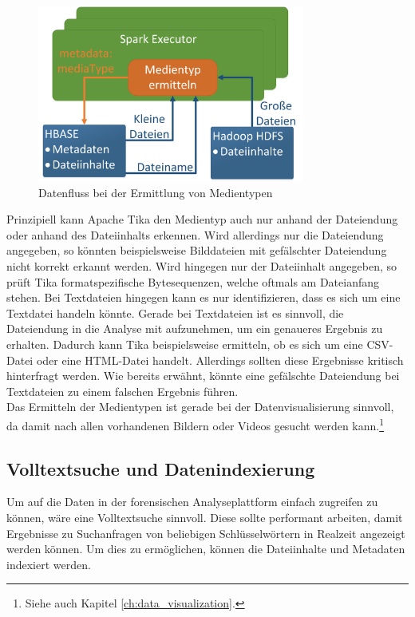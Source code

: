 \begin{figure}[ht]
  \centering
  \includegraphics[width=0.78\textwidth]{./resource/spark_processing_media_types.png}
  \caption{Datenfluss bei der Ermittlung von Medientypen}
  \label{fig:data_processing_media_types}
\end{figure}

\noindent
Prinzipiell kann Apache Tika den Medientyp auch nur anhand der Dateiendung oder anhand des Dateiinhalts erkennen. Wird allerdings nur die Dateiendung angegeben, so könnten beispielsweise Bilddateien mit gefälschter Dateiendung nicht korrekt erkannt werden. Wird hingegen nur der Dateiinhalt angegeben, so prüft Tika formatspezifische Bytesequenzen, welche oftmals am Dateianfang stehen. Bei Textdateien hingegen kann es nur identifizieren, dass es sich um eine Textdatei handeln könnte. Gerade bei Textdateien ist es sinnvoll, die Dateiendung in die Analyse mit aufzunehmen, um ein genaueres Ergebnis zu erhalten. Dadurch kann Tika beispielsweise ermitteln, ob es sich um eine CSV-Datei oder eine HTML-Datei handelt. Allerdings sollten diese Ergebnisse kritisch hinterfragt werden. Wie bereits erwähnt, könnte eine gefälschte Dateiendung bei Textdateien zu einem falschen Ergebnis führen.\\
Das Ermitteln der Medientypen ist gerade bei der Datenvisualisierung sinnvoll, da damit nach allen vorhandenen Bildern oder Videos gesucht werden kann.\footnote{Siehe auch Kapitel \ref{ch:data_visualization}.}

\subsection{Volltextsuche und Datenindexierung}
\label{subsec:file_indexing}
Um auf die Daten in der forensischen Analyseplattform einfach zugreifen zu können, wäre eine Volltextsuche sinnvoll. Diese sollte performant arbeiten, damit Ergebnisse zu Suchanfragen von beliebigen Schlüsselwörtern in Realzeit angezeigt werden können. Um dies zu ermöglichen, können die Dateiinhalte und Metadaten indexiert werden.\\

